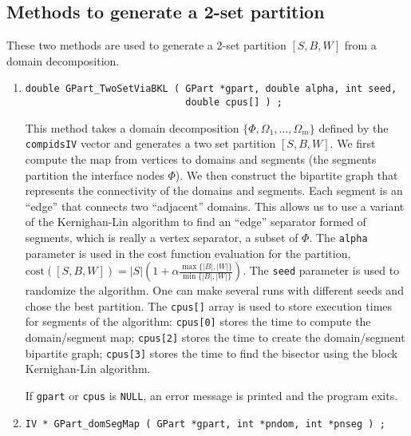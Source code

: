 \subsection{Methods to generate a 2-set partition}
\label{subsection:GPart:proto:2-set}
\par
These two methods are used to generate a 2-set partition
$[S,B,W]$ from a domain decomposition.
\par
\begin{enumerate}
\item
\begin{verbatim}
double GPart_TwoSetViaBKL ( GPart *gpart, double alpha, int seed,
                            double cpus[] ) ;
\end{verbatim}
This method takes a domain decomposition $\{\Phi, \Omega_1,
\ldots, \Omega_m\}$ defined by the {\tt compidsIV} vector
and generates a two set partition $[S,B,W]$.
We first compute the map from vertices to domains and segments
(the segments partition the interface nodes $\Phi$).
We then construct the bipartite graph that represents the
connectivity of the domains and segments.
Each segment is an ``edge'' that connects two ``adjacent'' domains.
This allows us to use a variant of the Kernighan-Lin algorithm to
find an ``edge'' separator formed of segments, 
which is really a vertex separator, a subset of $\Phi$.
The {\tt alpha} parameter is used in the cost function evaluation
for the partition,
$\displaystyle
\mbox{cost}([S,B,W]) = |S|\left(1 + \alpha
\frac{\max\{|B|,|W|\}}
{\min\{|B|,|W|\}}
\right)
$.
The {\tt seed} parameter is used to randomize the algorithm.
One can make several runs with different seeds and chose the best
partition.
The {\tt cpus[]} array is used to store execution times for
segments of the algorithm:
{\tt cpus[0]} stores the time to compute the domain/segment map;
{\tt cpus[2]} stores the time to create the domain/segment bipartite
graph;
{\tt cpus[3]} stores the time to find the bisector using the block
Kernighan-Lin algorithm.
\par {}
If {\tt gpart} or {\tt cpus} is {\tt NULL},
an error message is printed and the program exits.
\item
\begin{verbatim}
IV * GPart_domSegMap ( GPart *gpart, int *pndom, int *pnseg ) ;

\end{verbatim}
\end{enumerate}
